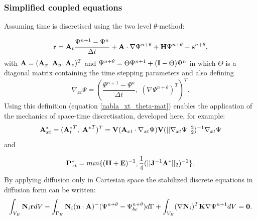 \subsubsection{Simplified coupled equations}

Assuming time is discretised
using the two level $\theta$-method:

\begin{equation}
{\bf r} = {\bf A}_t \frac{\Psi^{n+1}-\Psi^{n}}{\Delta t} +
{\bf A} \cdot {\nabla} \Psi^{n+\theta}
+ {\bf H} \Psi^{n+\theta}
-{\bf s}^{n+\theta} ,
\label{eqn-def-time-disc-mat}
\end{equation}
with ${\bf A} = ({\bf A}_x \;\; {\bf A}_y\;\; {\bf A}_z)^T$ and
$\Psi^{n+\theta}=\Theta\Psi^{n+1} + ({\bf I}-\Theta)\Psi^n$ in
which $\Theta$ is a diagonal matrix containing the time
stepping parameters and
also defining
\begin{equation}
{\nabla_{xt}} \Psi= (\frac{\Psi^{n+1}-\Psi^n}{\Delta t},\;( \nabla  \Psi^{n+\theta})^T)^T.
\label{nabla_xt_theta-mat}
\end{equation}
Using this definition (equation \ref{nabla_xt_theta-mat})
enables the application of the
mechanics of space-time discretisation, developed here,
for example:
\begin{equation}
{\bf A}_{xt}^*= ({{\bf A}_t^*}^T ,\; {{\bf A}^*}^T )^T=
 {{\bf V}({\bf A}_{xt}\cdot{\nabla_{xt}} \Psi) }
 { {\bf V}(\vert\vert {\nabla_{xt}} \Psi \vert\vert^2_2)^{-1}} {\nabla_{xt}} \Psi
\label{a*-def-simp-mat}
\end{equation}
and

\begin{equation}
 {\bf P}_{xt}^* = min\{ ({\bf H}+{\bf E})^{-1},
 \frac{1}{4} (\vert\vert {\bf J}^{-1} {\bf A}^* \vert\vert_2 )^{-1} \}.
\label{p*-def-simp-mat}
\end{equation}
 By applying diffusion only in Cartesian space
 the stabilized discrete equations in diffusion form can be written:
\begin{equation}
 \int_{V_E}
 {\bf N}_i {\bf r} d V - \int_{\Gamma_E} {\bf N}_i ({\bf n}\cdot {\bf A})^- (\Psi^{n+\theta}-\Psi_{bc}^{n+\theta})
 d \Gamma
 +
 \int_{{V_{E}}} ({\nabla} {\bf N}_i )^T {\bf K}  {\nabla} \Psi^{n+1} d V
 ={\bf 0}.
\label{discrete-eqn-diff-nu-simple-cartesian-mat}
\end{equation}




